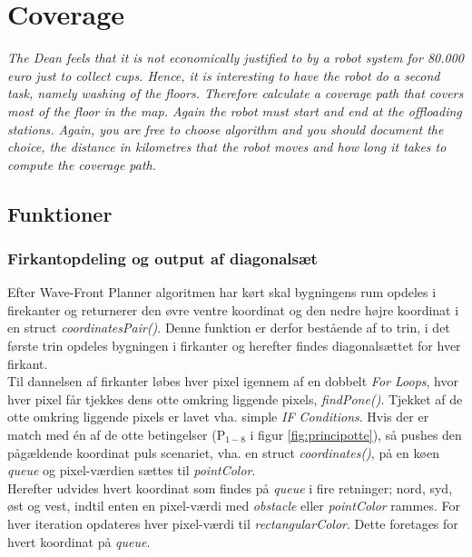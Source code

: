 \section{Coverage}
\label{sec:cov}
\textit{The Dean feels that it is not economically justified to by a robot system for 80.000 euro just to collect cups. Hence, it is interesting to have the robot do a second task, namely washing of the floors. Therefore calculate a coverage path that covers most of the floor in the map. Again the robot must start and end at the offloading stations.
Again, you are free to choose algorithm and you should document the choice, the distance in kilometres that the robot moves and how long it takes to compute the coverage path.}

\subsection{Funktioner}

\subsubsection{Firkantopdeling og output af diagonalsæt}
Efter Wave-Front Planner algoritmen har kørt skal bygningens rum opdeles i firekanter og returnerer den øvre ventre koordinat og den nedre højre koordinat i en struct \emph{coordinatesPair()}. Denne funktion er derfor bestående af to trin, i det første trin opdeles bygningen i firkanter og herefter findes diagonalsættet for hver firkant.\\
Til dannelsen af firkanter løbes hver pixel igennem af en dobbelt \emph{For Loops}, hvor hver pixel får tjekkes dens otte omkring liggende pixels, \emph{findPone()}. Tjekket af de otte omkring liggende pixels er lavet vha. simple \emph{IF Conditions}. Hvis der er match med én af de otte betingelser (P\(_{1-8}\) i figur \ref{fig:principotte}), så pushes den pågældende koordinat puls scenariet, vha. en struct \emph{coordinates()}, på en køen \emph{queue} og pixel-værdien sættes til \emph{pointColor}.\\
Herefter udvides hvert koordinat som findes på \emph{queue} i fire retninger; nord, syd, øst og vest, indtil enten en pixel-værdi med \emph{obstacle} eller \emph{pointColor} rammes. For hver iteration opdateres hver pixel-værdi til \emph{rectangularColor}. Dette foretages for hvert koordinat på \emph{queue}.\\

